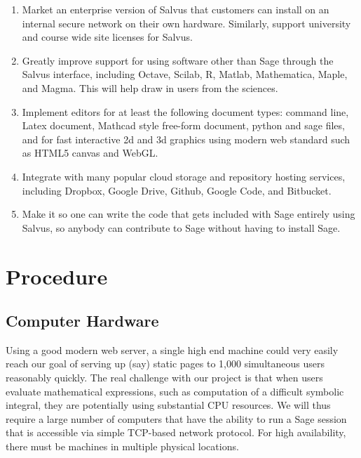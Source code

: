\documentclass[11pt]{article}
\begin{document}
\begin{enumerate}
\item Market an enterprise version of Salvus that customers can
  install on an internal secure network on their own hardware.
  Similarly, support university and course wide site licenses for
  Salvus.
\item Greatly improve support for using software other than Sage
  through the Salvus interface, including Octave, Scilab, R, Matlab,
  Mathematica, Maple, and Magma. This will help draw in users from the
  sciences.
\item Implement editors for at least the following document types:
  command line, Latex document, Mathcad style free-form document,
  python and sage files, and for fast interactive 2d and 3d graphics
  using modern web standard such as HTML5 canvas and WebGL.
\item Integrate with many popular cloud storage and repository hosting
  services, including Dropbox, Google Drive, Github, Google Code, and
  Bitbucket.
\item Make it so one can write the code that
  gets included with Sage entirely using Salvus, so anybody can
  contribute to Sage without having to install Sage.
\end{enumerate}


\section{Procedure}


\subsection{Computer Hardware}
Using a good modern web server, a single high end machine could very
easily reach our goal of serving up (say) static pages to 1,000
simultaneous users reasonably quickly.  The real challenge with our
project is that when users evaluate mathematical expressions, such as
computation of a difficult symbolic integral, they are potentially
using substantial CPU resources.  We will thus require a large number
of computers that have the ability to run a Sage session that is
accessible via simple TCP-based network protocol.  For high
availability, there must be machines in multiple physical locations.
\end{document}
